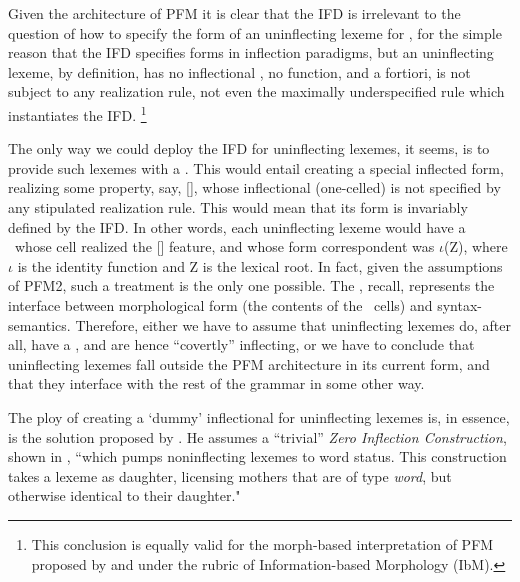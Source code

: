 \documentclass[output=paper,colorlinks,citecolor=brown]{langscibook}
\begin{document}
Given the architecture of PFM it is clear that the IFD is irrelevant to the  question of how to specify the form of an uninflecting lexeme for , for the simple reason that the IFD specifies forms in inflection paradigms, but an uninflecting lexeme, by definition, has no inflectional , no  function, and a fortiori, is not subject to any realization rule, not even the maximally underspecified rule  which instantiates the IFD.%
\footnote{This conclusion is equally valid for the morph-based interpretation of PFM proposed by \citet{crysmannbonami2016} and \citet{crysmann2020} under the rubric of Information-based Morphology (IbM).} 

The only way we could deploy the IFD for uninflecting lexemes, it seems, is to provide such lexemes with a . This would entail creating  a special inflected form, realizing some  property, say, [], whose inflectional (one-celled)  is not specified by any stipulated realization rule. This would mean that its form is invariably defined by the IFD. In other words,  each uninflecting lexeme would have a \PC\ whose cell realized the [] feature, and whose form correspondent was $\iota$(Z), where $\iota$ is the identity function and Z is the lexical root. %
In fact, given the assumptions of PFM2, such a treatment is the only one possible. The \PC, recall, represents the interface between morphological form (the contents of the \PF\ cells) and syntax-semantics. Therefore, either we have to assume that uninflecting lexemes do, after all, have a \PC, and are hence ``covertly'' inflecting, or we have to conclude that uninflecting lexemes fall outside the PFM architecture in its current form, and that they interface with the rest of the grammar in some other way. 

The ploy of creating a `dummy' inflectional  for uninflecting lexemes is,  in essence, is the solution proposed by \citet[119]{sag2012}. He assumes a ``trivial''  \textit{Zero Inflection Construction}, shown in , ``which pumps noninflecting lexemes to word status. This construction takes a lexeme as daughter, licensing mothers that are of type \textit{word}, but otherwise identical to their daughter."
\end{document}
